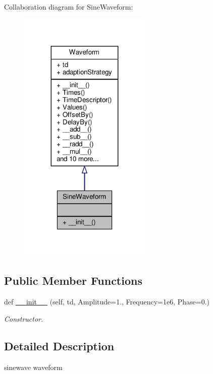 Collaboration diagram for Sine\+Waveform\+:\nopagebreak
\begin{figure}[H]
\begin{center}
\leavevmode
\includegraphics[width=179pt]{classSignalIntegrity_1_1TimeDomain_1_1Waveform_1_1SineWaveform_1_1SineWaveform__coll__graph}
\end{center}
\end{figure}
\subsection*{Public Member Functions}
\begin{DoxyCompactItemize}
\item 
def \hyperlink{classSignalIntegrity_1_1TimeDomain_1_1Waveform_1_1SineWaveform_1_1SineWaveform_a4998578e3228973c947cb920d4392c79}{\+\_\+\+\_\+init\+\_\+\+\_\+} (self, td, Amplitude=1., Frequency=1e6, Phase=0.)
\begin{DoxyCompactList}\small\item\em Constructor. \end{DoxyCompactList}\end{DoxyCompactItemize}


\subsection{Detailed Description}
sinewave waveform 

